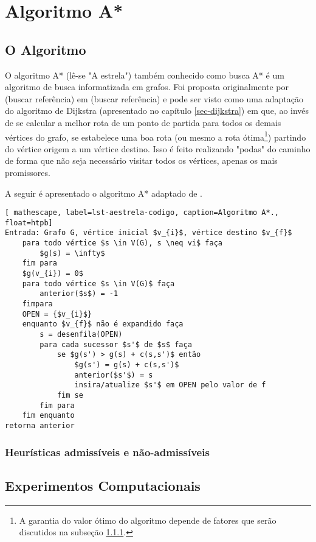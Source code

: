 \chapter{Algoritmo A*}
\label{sec-aestrela}

\section{O Algoritmo}
\label{sec-aestrela-algoritmo}
O algoritmo A* (lê-se "A estrela") também conhecido como busca A* é um algoritmo de busca informatizada em grafos. Foi proposta originalmente por (buscar referência) em (buscar referência) e pode ser visto como uma adaptação do algoritmo de Dijkstra (apresentado no capítulo \ref{sec-dijkstra}) em que, ao invés de se calcular a melhor rota de um ponto de partida para todos os demais vértices do grafo, se estabelece uma boa rota (ou mesmo a rota ótima\footnote{A garantia do valor ótimo do algoritmo depende de fatores que serão discutidos na subseção \ref{sec-aestrela-algoritmo-heuristica}.}) partindo do vértice origem a um vértice destino. Isso é feito realizando "podas" do caminho de forma que não seja necessário visitar todos os vértices, apenas os mais promissores.

A seguir é apresentado o algoritmo A* adaptado de .

\begin{lstlisting}[ mathescape, label=lst-aestrela-codigo, caption=Algoritmo A*., float=htpb]
Entrada: Grafo G, vértice inicial $v_{i}$, vértice destino $v_{f}$
	para todo vértice $s \in V(G), s \neq vi$ faça
		$g(s) = \infty$
	fim para
	$g(v_{i}) = 0$
	para todo vértice $s \in V(G)$ faça
		anterior($s$) = -1
	fimpara
	OPEN = {$v_{i}$}
	enquanto $v_{f}$ não é expandido faça
		s = desenfila(OPEN)
		para cada sucessor $s'$ de $s$ faça
			se $g(s') > g(s) + c(s,s')$ então
				$g(s') = g(s) + c(s,s')$
				anterior($s'$) = s
				insira/atualize $s'$ em OPEN pelo valor de f
			fim se
		fim para
	fim enquanto
retorna anterior
\end{lstlisting}



\subsection{Heurísticas admissíveis e não-admissíveis}
\label{sec-aestrela-algoritmo-heuristica}  

\section{Experimentos Computacionais}
\label{sec-aestrela-experimentos}
